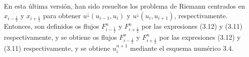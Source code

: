 En esta última versión, han sido resueltos los problema de Riemann
centrados en $x_{i-\frac{1}{2}}$ y $x_{i+\frac{1}{2}}$ para obtener
$u^{\downarrow}\left(u_{i-1},u_{i}\right)$ y
$u^{\downarrow}\left(u_{i},u_{i+1}\right)$, respectivamente.
Entonces, son definidos os flujos $F^{n}_{i-\frac{1}{2}}$ y
$F^{n}_{i+\frac{1}{2}}$ por las expresiones (3.12) y (3.11)
respectivamente, y se obtiene os flujos $F^{n}_{i-\frac{1}{2}}$ y
$F^{n}_{i+\frac{1}{2}}$ por las expresiones (3.12) y (3.11)
respectivamente, y se obtiene $u^{n+1}_{i}$ mediante el esquema
numérico 3.4.